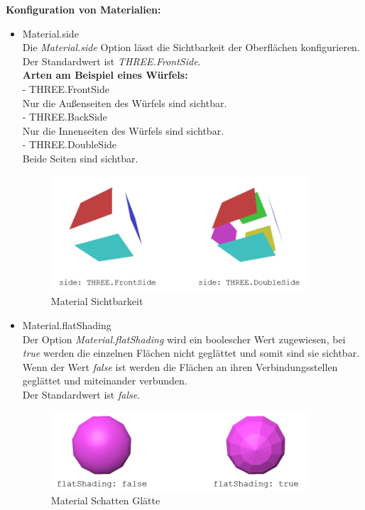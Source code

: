 \textbf{Konfiguration von Materialien:} \cite{material}

\begin{itemize}
\item Material.side \\
Die \textit{Material.side} Option lässt die Sichtbarkeit der Oberflächen konfigurieren. Der Standardwert ist \textit{THREE.FrontSide}. \\
\textbf{Arten am Beispiel eines Würfels:}\\
- THREE.FrontSide \\
Nur die Außenseiten des Würfels sind sichtbar. \\
- THREE.BackSide \\
Nur die Innenseiten des Würfels sind sichtbar. \\
- THREE.DoubleSide \\
Beide Seiten sind sichtbar. \\
\begin{figure}[h]
    \centering
    \includegraphics[width=0.9\textwidth]{images/doubleside.png}
    \caption{Material Sichtbarkeit}
    \label{fig:my_label}
\end{figure}
\newpage
\item Material.flatShading\\
Der Option \textit{Material.flatShading} wird ein boolescher Wert zugewiesen, bei \textit{true} werden die einzelnen Flächen nicht geglättet und somit sind sie sichtbar. Wenn der Wert \textit{false} ist werden die Flächen an ihren Verbindungsstellen geglättet und miteinander verbunden.\\ Der Standardwert ist \textit{false}. 
\begin{figure}[h]
    \centering
    \includegraphics[width=0.9\textwidth]{images/flatShading.png}
    \caption{Material Schatten Glätte}
    \label{fig:my_label}
\end{figure}


\end{itemize}
